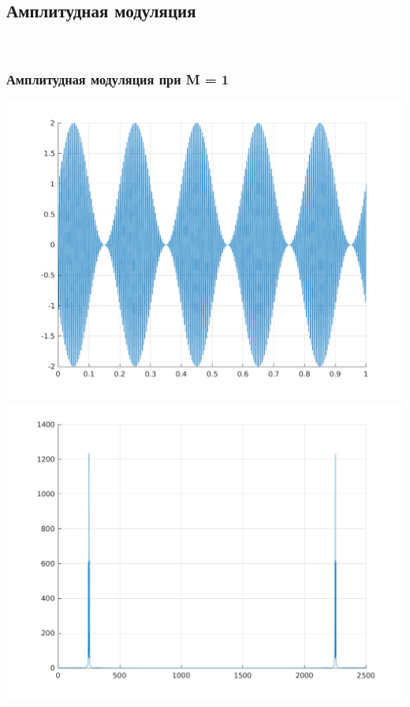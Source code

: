 \documentclass[a4paper]{article}
\begin{document}
\subsection{Амплитудная модуляция}
\\
\subsubsection{Амплитудная модуляция при M = 1}
\includegraphics[scale=0.45]{lab4/figures/figure_1.png}
\includegraphics[scale=0.45]{lab4/figures/figure_2.png}\\
\end{document}
